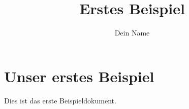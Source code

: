 \documentclass[pdftex,a4paper]{scrartcl}
\title{Erstes Beispiel}
\author{Dein Name}
\begin{document}
\maketitle

\tableofcontents

\section{Unser erstes Beispiel}

Dies ist das erste Beispieldokument.
\end{document}
